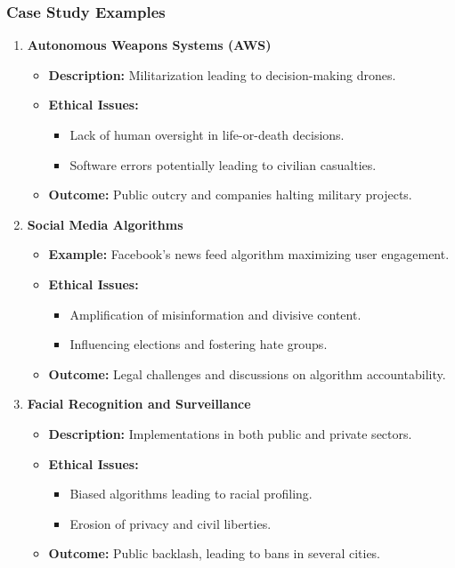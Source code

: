 \documentclass{beamer}
\begin{document}
\begin{frame}[fragile]
    \frametitle{Case Study Examples}
    \begin{enumerate}
        \item \textbf{Autonomous Weapons Systems (AWS)}
            \begin{itemize}
                \item \textbf{Description:} Militarization leading to decision-making drones.
                \item \textbf{Ethical Issues:}
                    \begin{itemize}
                        \item Lack of human oversight in life-or-death decisions.
                        \item Software errors potentially leading to civilian casualties.
                    \end{itemize}
                \item \textbf{Outcome:} Public outcry and companies halting military projects.
            \end{itemize}
        
        \item \textbf{Social Media Algorithms}
            \begin{itemize}
                \item \textbf{Example:} Facebook's news feed algorithm maximizing user engagement.
                \item \textbf{Ethical Issues:}
                    \begin{itemize}
                        \item Amplification of misinformation and divisive content.
                        \item Influencing elections and fostering hate groups.
                    \end{itemize}
                \item \textbf{Outcome:} Legal challenges and discussions on algorithm accountability.
            \end{itemize}
        
        \item \textbf{Facial Recognition and Surveillance}
            \begin{itemize}
                \item \textbf{Description:} Implementations in both public and private sectors.
                \item \textbf{Ethical Issues:}
                    \begin{itemize}
                        \item Biased algorithms leading to racial profiling.
                        \item Erosion of privacy and civil liberties.
                    \end{itemize}
                \item \textbf{Outcome:} Public backlash, leading to bans in several cities.
            \end{itemize}
    \end{enumerate}
\end{frame}
\end{document}

